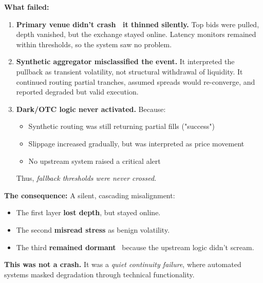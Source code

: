   


  
  
  
  
  \medskip
  
  \textbf{What failed:}
  \begin{enumerate}
    \item \textbf{Primary venue didn't crash \textemdash\ it thinned silently.} Top bids were pulled, depth 
    vanished, but the exchange stayed online. Latency monitors remained within thresholds, so the system saw 
    no problem.
  
    \item \textbf{Synthetic aggregator misclassified the event.} It interpreted the pullback as transient 
    volatility, not structural withdrawal of liquidity. It continued routing partial tranches, assumed spreads 
    would re-converge, and reported degraded but valid execution.
  
    \item \textbf{Dark/OTC logic never activated.} Because:
    \begin{itemize}
      \item Synthetic routing was still returning partial fills ("success")
      \item Slippage increased gradually, but was interpreted as price movement
      \item No upstream system raised a critical alert
    \end{itemize}
  
    Thus, \textit{fallback thresholds were never crossed}.
  \end{enumerate}
  
  \medskip
  
  \textbf{The consequence:} A silent, cascading misalignment:
  \begin{itemize}
    \item The first layer \textbf{lost depth}, but stayed online.
    \item The second \textbf{misread stress} as benign volatility.
    \item The third \textbf{remained dormant} \textemdash\ because the upstream logic didn’t scream.
  \end{itemize}
  
  \medskip
  
  \textbf{This was not a crash.} It was a \textit{quiet continuity failure}, where automated systems masked degradation 
  through technical functionality.
  
  \medskip
  
